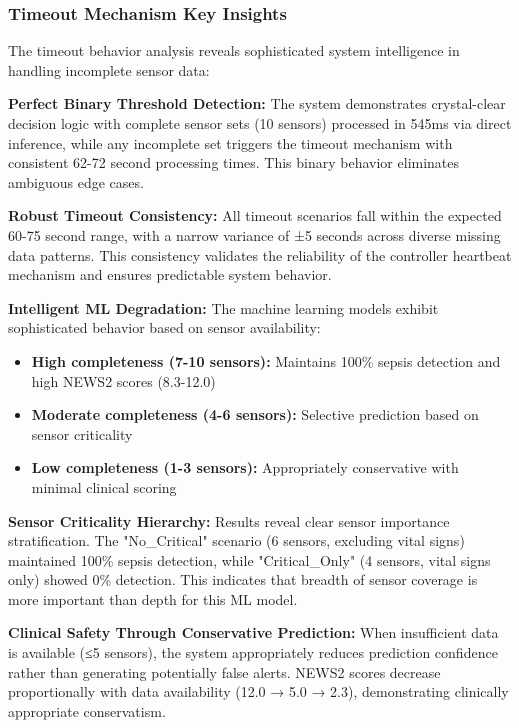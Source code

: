 \subsubsection{Timeout Mechanism Key Insights}

The timeout behavior analysis reveals sophisticated system intelligence in handling incomplete sensor data:

\textbf{Perfect Binary Threshold Detection:} The system demonstrates crystal-clear decision logic with complete sensor sets (10 sensors) processed in 545ms via direct inference, while any incomplete set triggers the timeout mechanism with consistent 62-72 second processing times. This binary behavior eliminates ambiguous edge cases.

\textbf{Robust Timeout Consistency:} All timeout scenarios fall within the expected 60-75 second range, with a narrow variance of ±5 seconds across diverse missing data patterns. This consistency validates the reliability of the controller heartbeat mechanism and ensures predictable system behavior.

\textbf{Intelligent ML Degradation:} The machine learning models exhibit sophisticated behavior based on sensor availability:
\begin{itemize}
    \item \textbf{High completeness (7-10 sensors):} Maintains 100\% sepsis detection and high NEWS2 scores (8.3-12.0)
    \item \textbf{Moderate completeness (4-6 sensors):} Selective prediction based on sensor criticality
    \item \textbf{Low completeness (1-3 sensors):} Appropriately conservative with minimal clinical scoring
\end{itemize}

\textbf{Sensor Criticality Hierarchy:} Results reveal clear sensor importance stratification. The "No\_Critical" scenario (6 sensors, excluding vital signs) maintained 100\% sepsis detection, while "Critical\_Only" (4 sensors, vital signs only) showed 0\% detection. This indicates that breadth of sensor coverage is more important than depth for this ML model.

\textbf{Clinical Safety Through Conservative Prediction:} When insufficient data is available (≤5 sensors), the system appropriately reduces prediction confidence rather than generating potentially false alerts. NEWS2 scores decrease proportionally with data availability (12.0 → 5.0 → 2.3), demonstrating clinically appropriate conservatism.

